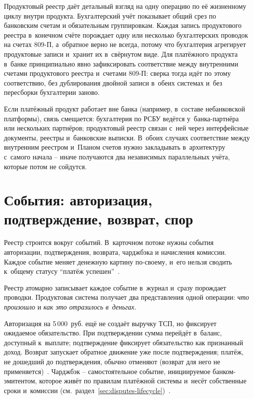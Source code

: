 Продуктовый реестр даёт детальный взгляд на одну операцию по её жизненному
циклу внутри продукта. Бухгалтерский учёт показывает
общий срез по банковским счетам и обязательным группировкам.
Каждая запись продуктового реестра в~конечном счёте порождает одну
или несколько бухгалтерских проводок на счетах 809-П, а~обратное
верно не всегда, потому что бухгалтерия агрегирует продуктовые
записи и~хранит их в~свёрнутом виде. Для платёжного продукта в~банке
принципиально явно зафиксировать соответствие между внутренними
счетами продуктового реестра и~счетами 809-П: сверка тогда идёт
по этому соответствию, без дублирования двойной записи в~обеих
системах и~без пересборки бухгалтерии заново.

Если платёжный продукт работает вне банка (например,
в~составе небанковской платформы), связь смещается: бухгалтерия
по РСБУ ведётся у~банка-партнёра или нескольких партнёров;
продуктовый реестр связан с~ней через интерфейсные документы,
реестры и~банковские выписки. В~обоих случаях соответствие между
внутренним реестром и~Планом счетов нужно закладывать в~архитектуру
с~самого начала -- иначе получаются два независимых параллельных
учёта, которые потом не сойдутся.

\section{События: авторизация, подтверждение, возврат, спор}\label{sec:ledger-events}

Реестр строится вокруг событий. В~карточном потоке нужны события
авторизации, подтверждения, возврата, чарджбэка и начисления
комиссии. Каждое событие меняет денежную картину по-своему, и~его нельзя сводить к~общему статусу
\enquote{платёж успешен}~\cite{mc-tpr,mc-chargeback-guide,adyen-glossary}.

Реестр атомарно записывает каждое событие в~журнал и~сразу
порождает проводки. Продуктовая система получает два представления
одной операции: \textit{что произошло} и \textit{как это
отразилось в~деньгах}.

Авторизация на 5\,000~руб. ещё не создаёт выручку ТСП, но фиксирует
ожидаемое обязательство. При подтверждении сумма перейдёт
в~баланс, доступный к~выплате; подтверждение фиксирует
обязательство как признанный доход. Возврат запускает обратное движение уже
после подтверждения; платёж, не дошедший до подтверждения,
обычно отменяют (возврат для него не применяется)~\cite{adyen-glossary,stripe-manual-capture}.
Чарджбэк -- самостоятельное событие, инициируемое
банком-эмитентом, которое живёт по правилам платёжной системы
и~несёт собственные сроки и~комиссии
(см.\ раздел~\ref{sec:disputes-lifecycle})~\cite{adyen-glossary,mc-chargeback-guide}.

